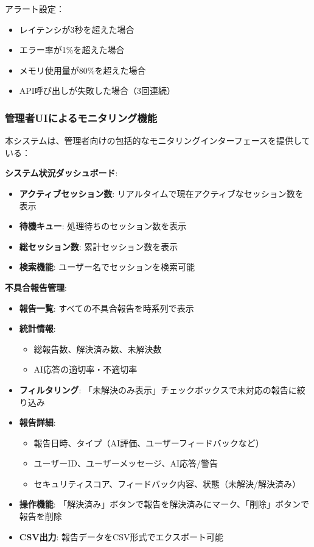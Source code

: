 \documentclass[a4paper,11pt,ja=standard,xelatex]{bxjsarticle}
\theoremstyle{definition}
\begin{document}
アラート設定：
\begin{itemize}
\item レイテンシが3秒を超えた場合
\item エラー率が1\%を超えた場合
\item メモリ使用量が80\%を超えた場合
\item API呼び出しが失敗した場合（3回連続）
\end{itemize}

\subsubsection{管理者UIによるモニタリング機能}

本システムは、管理者向けの包括的なモニタリングインターフェースを提供している：

\textbf{システム状況ダッシュボード}:
\begin{itemize}
\item \textbf{アクティブセッション数}: リアルタイムで現在アクティブなセッション数を表示
\item \textbf{待機キュー}: 処理待ちのセッション数を表示
\item \textbf{総セッション数}: 累計セッション数を表示
\item \textbf{検索機能}: ユーザー名でセッションを検索可能
\end{itemize}

\textbf{不具合報告管理}:
\begin{itemize}
\item \textbf{報告一覧}: すべての不具合報告を時系列で表示
\item \textbf{統計情報}: 
  \begin{itemize}
  \item 総報告数、解決済み数、未解決数
  \item AI応答の適切率・不適切率
  \end{itemize}
\item \textbf{フィルタリング}: 「未解決のみ表示」チェックボックスで未対応の報告に絞り込み
\item \textbf{報告詳細}: 
  \begin{itemize}
  \item 報告日時、タイプ（AI評価、ユーザーフィードバックなど）
  \item ユーザーID、ユーザーメッセージ、AI応答/警告
  \item セキュリティスコア、フィードバック内容、状態（未解決/解決済み）
  \end{itemize}
\item \textbf{操作機能}: 「解決済み」ボタンで報告を解決済みにマーク、「削除」ボタンで報告を削除
\item \textbf{CSV出力}: 報告データをCSV形式でエクスポート可能
\end{itemize}
\end{document}
